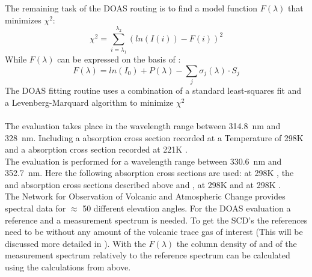The remaining task of the DOAS routing is to find a model function $F \left(\lambda\right)$ that minimizes $\chi^2$:
\begin{equation}
\chi^2 = \sum_{i=\lambda_1}^{\lambda_2}\left(ln(I(i))-F(i)\right)^2
\end{equation}
While $F\left(\lambda\right)$ can be expressed on the basis of :
\begin{equation}
F\left(\lambda\right) = ln\left(I_0 \right) + P \left(\lambda\right)-
\sum_{j}\sigma_j \left(\lambda\right) \cdot S_j
\end{equation}
The DOAS fitting routine uses a combination of a standard least-squares fit and a Levenberg-Marquard algorithm to minimize $\chi^2$\\
\\
The  evaluation takes place in the wavelength range between 314.8~nm and 328~nm. Including a  absorption cross section recorded at a Temperature of 298K \cite{vandaele2009fourier} and a   absorption cross section recorded at 221K \cite{burrows1999atmospheric}.\\
The   evaluation is performed for a wavelength range between 330.6~nm and 352.7~nm. Here the following absorption cross sections are used:
  at 298K \cite{fleischmann2004new}, the  and   absorption cross sections described above and   \cite{hermans2003absorption},   at 298K \cite{vandaele1998measurements} and   at 298K \cite{meller2000temperature}.\\
%
The Network for Observation of Volcanic and Atmospheric Change provides spectral data for $\approx$ 50 different elevation angles. For the DOAS evaluation a reference and a measurement spectrum is needed. To get the SCD's the references need to be without any amount of the volcanic trace gas of interest (This will be discussed more detailed in ). With the $F\left(\lambda\right)$ the column density of    and  of the measurement spectrum relatively to the reference spectrum can be calculated using the calculations from above. \\
\\

